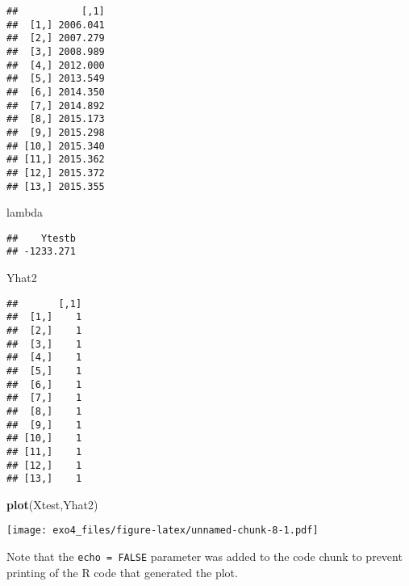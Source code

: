 \documentclass[
]{article}
\newenvironment{Shaded}{\begin{snugshade}}{\end{snugshade}}
\newcommand{\KeywordTok}[1]{\textcolor[rgb]{0.13,0.29,0.53}{\textbf{#1}}}
\newcommand{\NormalTok}[1]{#1}
\begin{document}
\begin{verbatim}
##           [,1]
##  [1,] 2006.041
##  [2,] 2007.279
##  [3,] 2008.989
##  [4,] 2012.000
##  [5,] 2013.549
##  [6,] 2014.350
##  [7,] 2014.892
##  [8,] 2015.173
##  [9,] 2015.298
## [10,] 2015.340
## [11,] 2015.362
## [12,] 2015.372
## [13,] 2015.355
\end{verbatim}

\begin{Shaded}
\begin{Highlighting}[]
\NormalTok{lambda}
\end{Highlighting}
\end{Shaded}

\begin{verbatim}
##    Ytestb 
## -1233.271
\end{verbatim}

\begin{Shaded}
\begin{Highlighting}[]
\NormalTok{Yhat2}
\end{Highlighting}
\end{Shaded}

\begin{verbatim}
##       [,1]
##  [1,]    1
##  [2,]    1
##  [3,]    1
##  [4,]    1
##  [5,]    1
##  [6,]    1
##  [7,]    1
##  [8,]    1
##  [9,]    1
## [10,]    1
## [11,]    1
## [12,]    1
## [13,]    1
\end{verbatim}

\begin{Shaded}
\begin{Highlighting}[]
\KeywordTok{plot}\NormalTok{(Xtest,Yhat2)}
\end{Highlighting}
\end{Shaded}

\texttt{[image: exo4\_files/figure-latex/unnamed-chunk-8-1.pdf]}

Note that the \texttt{echo\ =\ FALSE} parameter was added to the code
chunk to prevent printing of the R code that generated the plot.
\end{document}
